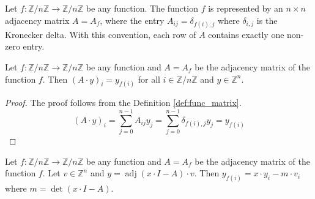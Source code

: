 %
%
%

\begin{definition}
\label{def:func_matrix}
\leanok
Let $f: \mathbb{Z}/n\mathbb{Z} \to \mathbb{Z}/n\mathbb{Z}$ be any function. The function $f$ is represented by an 
$n \times n$ adjacency matrix $A=A_f$, where the entry 
$A_{ij} = \delta_{f(i),j}$ 
where $\delta_{i,j}$ is the Kronecker delta.
With this convention, each row of $A$ contains exactly one non-zero entry.
\end{definition}

\begin{lemma}
\label{lem:func_matrix_eq}
\leanok
Let $f: \mathbb{Z}/n\mathbb{Z} \to \mathbb{Z}/n\mathbb{Z}$ be any function and $A=A_f$ be the adjacency matrix of the function $f$. 
Then $(A\cdot y)_i = y_{f(i)}$ for all $i\in \mathbb{Z}/n\mathbb{Z}$ and $y\in \mathbb{Z}^n$.
\end{lemma}

\begin{proof}
The proof follows from the Definition \ref{def:func_matrix}.
$$(A\cdot y)_i = \sum_{j=0}^{n-1} A_{ij} y_j = \sum_{j=0}^{n-1} \delta_{f(i),j} y_j = y_{f(i)}$$
\end{proof}

\begin{lemma}
\label{lem:adj_eq}
\leanok
Let $f: \mathbb{Z}/n\mathbb{Z} \to \mathbb{Z}/n\mathbb{Z}$ be any function and $A=A_f$ be the adjacency matrix of the function $f$. 
Let $v\in \mathbb{Z}^n$ and $y = \operatorname{adj}(x\cdot I - A)\cdot v$. 
Then $y_{f(i)} = x\cdot y_i - m\cdot v_i$ where $m = \det(x\cdot I - A)$.
\end{lemma}

